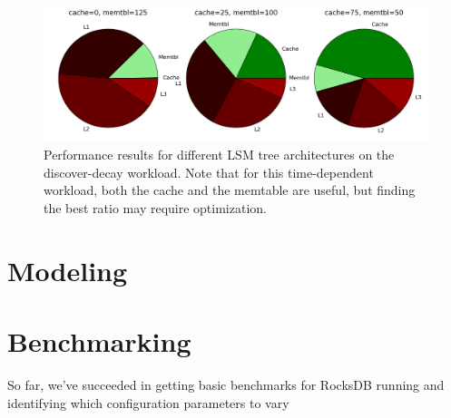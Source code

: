 \documentclass[11pt]{article}
\begin{document}
\begin{figure}[!htb]
\begin{center}
\includegraphics[width=\textwidth]{sameqs-difftree.png}
\end{center}
\caption{Performance results for different LSM tree architectures on the
discover-decay workload. Note that for this time-dependent workload, both the
cache and the memtable are useful, but finding the best ratio may require
optimization.}
\label{fig:sameqs-difftree}
\end{figure}

\section{Modeling}


\section{Benchmarking}

So far, we've succeeded in getting basic benchmarks for RocksDB running and
identifying which configuration parameters to vary


\small

\end{document}
